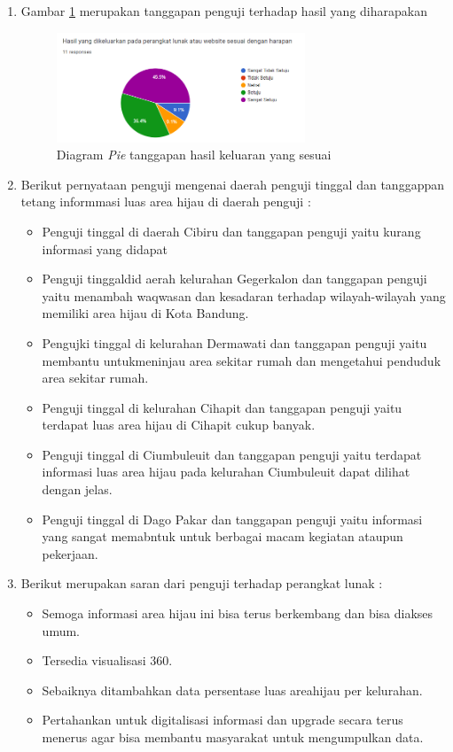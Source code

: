 \begin{enumerate}
	\item Gambar \ref{fig:respon7} merupakan tanggapan penguji terhadap hasil yang diharapakan\\
	\begin{figure}[H]
		\centering
		\includegraphics[width=0.7\textwidth]{Gambar/respon7.png}
		\caption{Diagram \textit{Pie} tanggapan hasil keluaran yang sesuai}
		\label{fig:respon7}
	\end{figure}
	\item Berikut pernyataan penguji mengenai daerah penguji tinggal dan tanggappan tetang informmasi luas area hijau di daerah penguji :
		\begin{itemize}
			\item Penguji tinggal di daerah Cibiru  dan tanggapan penguji yaitu kurang informasi yang didapat
			\item Penguji  tinggaldid aerah kelurahan Gegerkalon dan tanggapan penguji yaitu menambah waqwasan dan kesadaran terhadap wilayah-wilayah yang memiliki area hijau  di Kota Bandung.
			\item Pengujki tinggal di kelurahan Dermawati dan tanggapan penguji yaitu membantu untukmeninjau area sekitar rumah dan mengetahui penduduk area sekitar rumah.
			\item Penguji tinggal di kelurahan Cihapit dan tanggapan penguji yaitu terdapat luas area hijau di Cihapit cukup banyak.
			\item Penguji tinggal di Ciumbuleuit dan tanggapan penguji yaitu terdapat informasi luas area hijau pada kelurahan Ciumbuleuit dapat dilihat dengan jelas.
			\item Penguji tinggal di Dago Pakar dan tanggapan penguji yaitu informasi yang sangat memabntuk untuk berbagai macam kegiatan ataupun pekerjaan.
 		\end{itemize}
	
	\item Berikut merupakan saran dari penguji terhadap perangkat lunak :
		\begin{itemize}
			\item Semoga informasi area hijau ini bisa terus berkembang dan bisa diakses umum.
			\item Tersedia visualisasi 360\degree.
			\item Sebaiknya ditambahkan data persentase luas areahijau per kelurahan.
			\item Pertahankan untuk digitalisasi informasi dan upgrade secara terus menerus agar bisa membantu masyarakat untuk mengumpulkan data.
			
		\end{itemize}
	
\end{enumerate}

